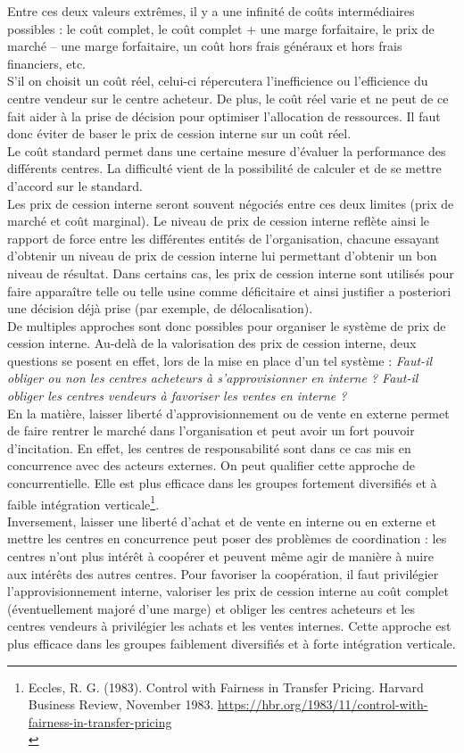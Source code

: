 \documentclass{kaobook}
\begin{document}
Entre ces deux valeurs extrêmes, il y a une infinité de coûts intermédiaires possibles : le coût complet, le coût complet + une marge forfaitaire, le prix de marché – une marge forfaitaire, un coût hors frais généraux et hors frais financiers, etc.\\
S’il on choisit un coût réel, celui-ci répercutera l’inefficience ou l’efficience du centre vendeur sur le centre acheteur. De plus, le coût réel varie et ne peut de ce fait aider à la prise de décision pour optimiser l’allocation de ressources. Il faut donc éviter de baser le prix de cession interne sur un coût réel.\\
Le coût standard permet dans une certaine mesure d’évaluer la performance des différents centres. La difficulté vient de la possibilité de calculer et de se mettre d’accord sur le standard.\\
Les prix de cession interne seront souvent négociés entre ces deux limites (prix de marché et coût marginal). Le niveau de prix de cession interne reflète ainsi le rapport de force entre les différentes entités de l’organisation, chacune essayant d’obtenir un niveau de prix de cession interne lui permettant d’obtenir un bon niveau de résultat. Dans certains cas, les prix de cession interne sont utilisés pour faire apparaître telle ou telle usine comme déficitaire et ainsi justifier a posteriori une décision déjà prise (par exemple, de délocalisation).\\

De multiples approches sont donc possibles pour organiser le système de prix de cession interne. Au-delà de la valorisation des prix de cession interne, deux questions se posent en effet, lors de la mise en place d’un tel système : \emph{Faut-il obliger ou non les centres acheteurs à s’approvisionner en interne ? Faut-il obliger les centres vendeurs à favoriser les ventes en interne ?}\\
En la matière, laisser liberté d’approvisionnement ou de vente en externe permet de faire rentrer le marché dans l’organisation et peut avoir un fort pouvoir d’incitation. En effet, les centres de responsabilité sont dans ce cas mis en concurrence avec des acteurs externes. On peut qualifier cette approche de concurrentielle. Elle est plus efficace dans les groupes fortement diversifiés et à faible intégration verticale\footnote{Eccles, R. G. (1983). Control with Fairness in Transfer Pricing. Harvard Business Review, November 1983. \url{https://hbr.org/1983/11/control-with-fairness-in-transfer-pricing}\\}.\\
Inversement, laisser une liberté d’achat et de vente en interne ou en externe et mettre les centres en concurrence peut poser des problèmes de coordination : les centres n’ont plus intérêt à coopérer et peuvent même agir de manière à nuire aux intérêts des autres centres. Pour favoriser la coopération, il faut privilégier l’approvisionnement interne, valoriser les prix de cession interne au coût complet (éventuellement majoré d'une marge) et obliger les centres acheteurs et les centres vendeurs à privilégier les achats et les ventes internes. Cette approche est plus efficace dans les groupes faiblement diversifiés et à forte intégration verticale.\\
\end{document}
